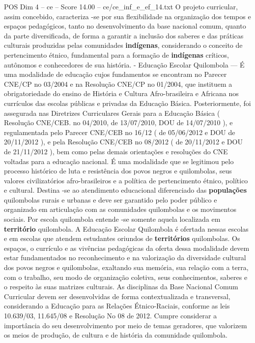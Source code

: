 \begin{textsample}{POS Dim 4 – ce – Score 14.00 – ce/ce\_inf\_e\_ef\_14.txt}
O projeto curricular, assim concebido, caracteriza -se por sua flexibilidade na organização dos tempos e espaços pedagógicos, tanto no desenvolvimento da base nacional comum, quanto da parte diversificada, de forma a garantir a inclusão dos saberes e das práticas culturais produzidas pelas comunidades \textbf{indígenas}, considerando o conceito de pertencimento étnico, fundamental para a formação de \textbf{indígenas} críticos, autônomos e conhecedores de sua história. - Educação Escolar Quilombola — É uma modalidade de educação cujos fundamentos se encontram no Parecer CNE/CP no 03/2004 e na Resolução CNE/CP no 01/2004, que instituem a obrigatoriedade do ensino de História e Cultura Afro-brasileira e Africana nos currículos das escolas públicas e privadas da Educação Básica.
Posteriormente, foi assegurada nas Diretrizes Curriculares Gerais para a Educação Básica ( Resolução CNE/CEB. no 04/2010, de 13/07/2010, DOU de 14/07/2010 ), e regulamentada pelo Parecer CNE/CEB no 16/12 ( de 05/06/2012 e DOU de 20/11/2012 ), e pela Resolução CNE/CEB no 08/2012 ( de 20/11/2012 e DOU de 21/11/2012 ), bem como pelas demais orientações e resoluções do CNE voltadas para a educação nacional.
É uma modalidade que se legitimou pelo processo histórico de luta e resistência dos povos negros e quilombolas, seus valores civilizatórios afro-brasileiros e a política de pertencimento étnico, político e cultural.
Destina -se ao atendimento educacional diferenciado das \textbf{populações} quilombolas rurais e urbanas e deve ser garantido pelo poder público e organizado em articulação com as comunidades quilombolas e os movimentos sociais.
Por escola quilombola entende -se somente aquela localizada em \textbf{território} quilombola.
A Educação Escolar Quilombola é ofertada nessas escolas e em escolas que atendem estudantes oriundos de \textbf{territórios} quilombolas.
Os espaços, o currículo e as vivências pedagógicas da oferta dessa modalidade devem estar fundamentados no reconhecimento e na valorização da diversidade cultural dos povos negros e quilombolas, exaltando sua memória, sua relação com a terra, com o trabalho, seu modo de organização coletiva, seus conhecimentos, saberes e o respeito às suas matrizes culturais.
As disciplinas da Base Nacional Comum Curricular devem ser desenvolvidas de forma contextualizada e transversal, considerando a Educação para as Relações Étnico-Raciais, conforme as leis 10.639/03, 11.645/08 e Resolução No 08 de 2012.
Cumpre considerar a importância do seu desenvolvimento por meio de temas geradores, que valorizem os meios de produção, de cultura e de história da comunidade quilombola.

\end{textsample}
